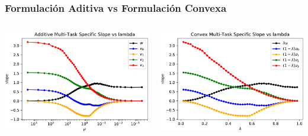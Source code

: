 \documentclass[aspectratio=43]{beamer}
\begin{document}
\begin{frame}
      \frametitle{Formulación Aditiva vs Formulación Convexa}

      \begin{columns}
            \begin{column}{0.5\textwidth}
                  \includegraphics[width=\textwidth]{Chapter6/HAIS2019/synthetic_specWeights_add-crop.pdf}
            \end{column}
            \begin{column}{0.5\textwidth}  %
                \begin{center}
                  \includegraphics[width=\textwidth]{Chapter6/HAIS2019/synthetic_specWeights_conv-crop.pdf}
                 \end{center}
            \end{column}
      \end{columns}


\end{frame}
\end{document}
